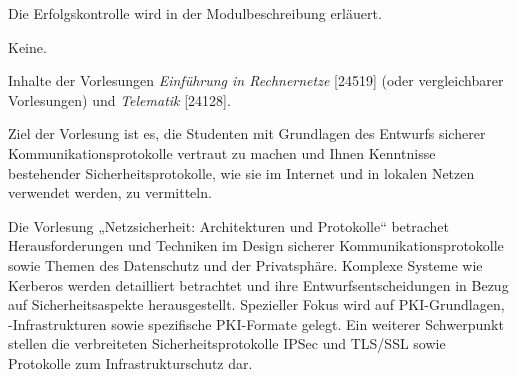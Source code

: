\begin{course}

\setdoclanguagegerman
{}



\coursehead


\label{cour_5339.dp_997}


\begin{styleenv}
\begin{assessment}
Die Erfolgskontrolle wird in der Modulbeschreibung erläuert.


\end{assessment}

\begin{conditions}Keine.\end{conditions}

\begin{recommendations}Inhalte der Vorlesungen \emph{Einführung in Rechnernetze} [24519] (oder vergleichbarer Vorlesungen) und \emph{Telematik }[24128].

\end{recommendations}
\end{styleenv}

\begin{learningoutcomes}
Ziel der Vorlesung ist es, die Studenten mit Grundlagen des Entwurfs sicherer Kommunikationsprotokolle vertraut zu machen und Ihnen Kenntnisse bestehender Sicherheitsprotokolle, wie sie im Internet und in lokalen Netzen verwendet werden, zu vermitteln.


\end{learningoutcomes}

\begin{content}
Die Vorlesung „Netzsicherheit: Architekturen und Protokolle“ betrachet Herausforderungen und Techniken im Design sicherer Kommunikationsprotokolle sowie Themen des Datenschutz und der Privatsphäre. Komplexe Systeme wie Kerberos werden detailliert betrachtet und ihre Entwurfsentscheidungen in Bezug auf Sicherheitsaspekte herausgestellt. Spezieller Fokus wird auf PKI-Grundlagen, -Infrastrukturen sowie spezifische PKI-Formate gelegt. Ein weiterer Schwerpunkt stellen die verbreiteten Sicherheitsprotokolle IPSec und TLS/SSL sowie Protokolle zum Infrastrukturschutz dar.



\end{content}
\end{course}
